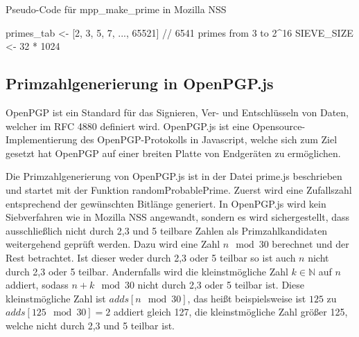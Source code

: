 \begin{algorithm}[h]
\DontPrintSemicolon
\caption{Pseudo-Code für mpp_make_prime in Mozilla NSS}
\label{alg:makePrimeGenerationNSS}
primes_tab <- [2, 3, 5, 7, ..., 65521] // 6541 primes from 3 to 2^16\;
SIEVE_SIZE <- 32 * 1024\;

\end{algorithm}

\subsection{Primzahlgenerierung in OpenPGP.js}

OpenPGP ist ein Standard für das Signieren, Ver- und Entschlüsseln von Daten, welcher im RFC 4880 \cite{rfc4880} definiert wird.
OpenPGP.js \cite{OpenPGPjs} ist eine Opensource-Implementierung des OpenPGP-Protokolls in Javascript, welche sich zum Ziel gesetzt hat OpenPGP auf einer breiten Platte von Endgeräten zu ermöglichen.

Die Primzahlgenerierung von OpenPGP.js ist in der Datei prime.js beschrieben und startet mit der Funktion randomProbablePrime.
Zuerst wird eine Zufallszahl entsprechend der gewünschten Bitlänge generiert.
In OpenPGP.js wird kein Siebverfahren wie in Mozilla NSS angewandt, sondern es wird sichergestellt, dass ausschließlich nicht durch 2,3 und 5 teilbare Zahlen als Primzahlkandidaten weitergehend geprüft werden.
Dazu wird eine Zahl $n \mod 30$ berechnet und der Rest betrachtet.
Ist dieser weder durch 2,3 oder 5 teilbar so ist auch $n$ nicht durch 2,3 oder 5 teilbar.
Andernfalls wird die kleinstmögliche Zahl $k \in \mathbb{N}$ auf $n$ addiert, sodass $n + k \mod 30$ nicht durch 2,3 oder 5 teilbar ist.
Diese kleinstmögliche Zahl ist $adds[n \mod 30]$, das heißt beispielsweise ist $125$ zu $adds[125 \mod 30] = 2$ addiert gleich 127, die kleinstmögliche Zahl größer 125, welche nicht durch 2,3 und 5 teilbar ist.


